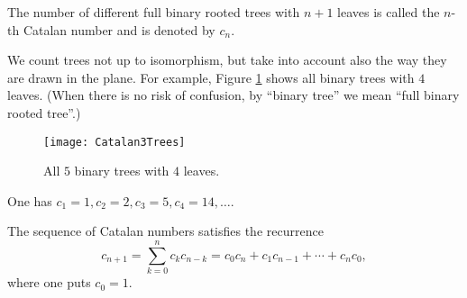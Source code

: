 \begin{page}

\begin{dfn}
The number of different full binary rooted trees with $n+1$ leaves is called the $n$-th Catalan number and is denoted by $c_n$.
\end{dfn}

\end{page}

\begin{page}

We count trees not up to isomorphism, but take into account also the way they are drawn in the plane.
For example, Figure \ref{fig:Catalan3Trees} shows all binary trees with $4$ leaves.
(When there is no risk of confusion, by ``binary tree'' we mean ``full binary rooted tree''.)

\begin{figure}[ht]
\begin{center}
\texttt{[image: Catalan3Trees]}
\end{center}
\caption{All $5$ binary trees with $4$ leaves.}
\label{fig:Catalan3Trees}
\end{figure}

One has $c_1 = 1, c_2 = 2, c_3 = 5, c_4 = 14, \ldots$.


\end{page}

\begin{page}

\begin{thm}
The sequence of Catalan numbers satisfies the recurrence
\begin{equation}
\label{eqn:CatalanRecursion}
c_{n+1} = \sum_{k=0}^n c_k c_{n-k} = c_0c_n + c_1c_{n-1} + \cdots + c_nc_0,
\end{equation}
where one puts $c_0 = 1$.
\end{thm}

\end{page}

